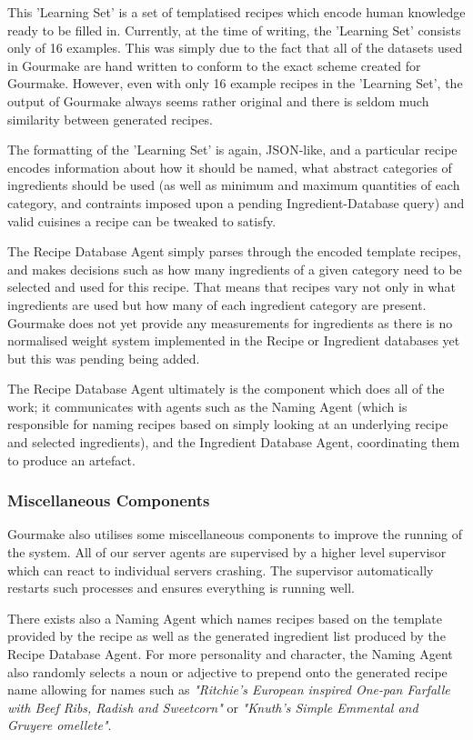\documentclass[9pt,titlepage,a4paper]{extarticle}
\begin{document}
    This 'Learning Set' is a set of templatised recipes which encode human knowledge ready to be filled in. Currently,
    at the time of writing, the 'Learning Set' consists only of 16 examples. This was simply due to the fact that
    all of the datasets used in Gourmake are hand written to conform to the exact scheme created for Gourmake. However,
    even with only 16 example recipes in the 'Learning Set', the output of Gourmake always seems rather original and
    there is seldom much similarity between generated recipes.

    The formatting of the 'Learning Set' is again, JSON-like, and a particular recipe encodes information about how it
    should be named, what abstract categories of ingredients should be used (as well as minimum and maximum quantities
    of each category, and contraints imposed upon a pending Ingredient-Database query) and valid cuisines a recipe
    can be tweaked to satisfy.

    The Recipe Database Agent simply parses through the encoded template recipes, and makes decisions such as how many
    ingredients of a given category need to be selected and used for this recipe. That means that recipes vary not only 
    in what ingredients are used but how many of each ingredient category are present. Gourmake does not yet provide
    any measurements for ingredients as there is no normalised weight system implemented in the Recipe or Ingredient
    databases yet but this was pending being added.

    The Recipe Database Agent ultimately is the component which does all of the work; it communicates with agents such
    as the Naming Agent (which is responsible for naming recipes based on simply looking at an underlying recipe and
    selected ingredients), and the Ingredient Database Agent, coordinating them to produce an artefact.

\subsubsection{Miscellaneous Components}
    Gourmake also utilises some miscellaneous components to improve the running of the system. All of our server agents
    are supervised by a higher level supervisor which can react to individual servers crashing. The supervisor automatically
    restarts such processes and ensures everything is running well.

    There exists also a Naming Agent which names recipes based on the template provided by the recipe as well as the
    generated ingredient list produced by the Recipe Database Agent. For more personality and character, the
    Naming Agent also randomly selects a noun or adjective to prepend onto the generated recipe name allowing for
    names such as \textit{"Ritchie's European inspired One-pan Farfalle with Beef Ribs, Radish and Sweetcorn"} or
    \textit{"Knuth's Simple Emmental and Gruyere omellete"}.
\end{document}
